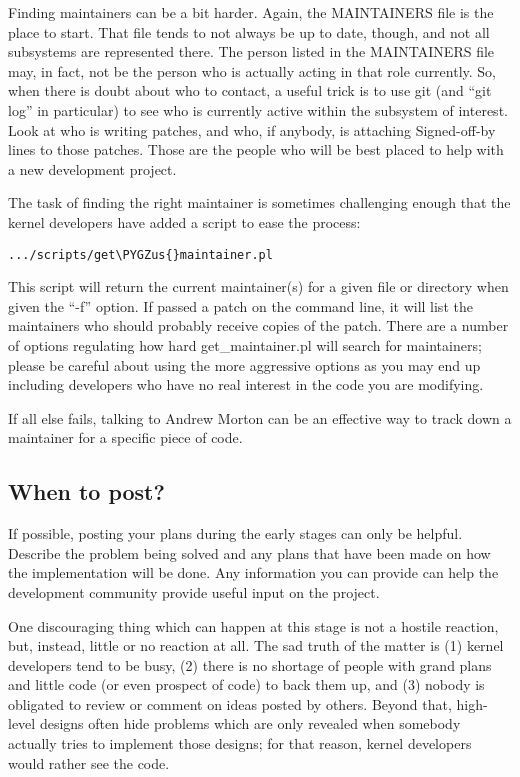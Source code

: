 \documentclass[a4paper,8pt,english]{sphinxmanual}
\def\PYGZus{\char`\_}
\begin{document}
Finding maintainers can be a bit harder.  Again, the MAINTAINERS file is
the place to start.  That file tends to not always be up to date, though,
and not all subsystems are represented there.  The person listed in the
MAINTAINERS file may, in fact, not be the person who is actually acting in
that role currently.  So, when there is doubt about who to contact, a
useful trick is to use git (and ``git log'' in particular) to see who is
currently active within the subsystem of interest.  Look at who is writing
patches, and who, if anybody, is attaching Signed-off-by lines to those
patches.  Those are the people who will be best placed to help with a new
development project.

The task of finding the right maintainer is sometimes challenging enough
that the kernel developers have added a script to ease the process:

\begin{Verbatim}[commandchars=\\\{\}]
.../scripts/get\PYGZus{}maintainer.pl
\end{Verbatim}

This script will return the current maintainer(s) for a given file or
directory when given the ``-f'' option.  If passed a patch on the
command line, it will list the maintainers who should probably receive
copies of the patch.  There are a number of options regulating how hard
get\_maintainer.pl will search for maintainers; please be careful about
using the more aggressive options as you may end up including developers
who have no real interest in the code you are modifying.

If all else fails, talking to Andrew Morton can be an effective way to
track down a maintainer for a specific piece of code.


\subsection{When to post?}
\label{process/3.Early-stage:when-to-post}
If possible, posting your plans during the early stages can only be
helpful.  Describe the problem being solved and any plans that have been
made on how the implementation will be done.  Any information you can
provide can help the development community provide useful input on the
project.

One discouraging thing which can happen at this stage is not a hostile
reaction, but, instead, little or no reaction at all.  The sad truth of the
matter is (1) kernel developers tend to be busy, (2) there is no shortage
of people with grand plans and little code (or even prospect of code) to
back them up, and (3) nobody is obligated to review or comment on ideas
posted by others.  Beyond that, high-level designs often hide problems
which are only revealed when somebody actually tries to implement those
designs; for that reason, kernel developers would rather see the code.
\end{document}
